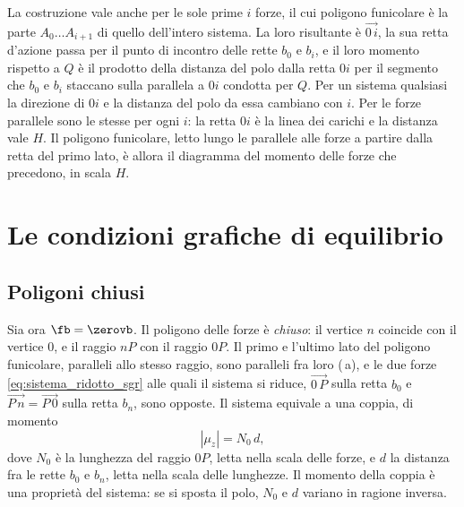 \begin{oss}
	\label{oss:momento_parziale_sgr}
	La costruzione vale anche per le sole prime $i$ forze, il cui poligono funicolare è la parte
	$A_0 \dots A_{i+1}$ di quello dell'intero sistema. La loro risultante è $\overrightarrow{0\,i}$,
	la sua retta d'azione passa per il punto di incontro delle rette $b_0$ e $b_i$, e il loro
	momento rispetto a $Q$ è il prodotto della distanza del polo dalla retta $0i$ per il segmento
	che $b_0$ e $b_i$ staccano sulla parallela a $0i$ condotta per $Q$. Per un sistema qualsiasi la
	direzione di $0i$ e la distanza del polo da essa cambiano con $i$. Per le forze parallele sono
	le stesse per ogni $i$: la retta $0i$ è la linea dei carichi e la distanza vale $H$. Il
	poligono funicolare, letto lungo le parallele alle forze a partire dalla retta del primo lato, è
	allora il diagramma del momento delle forze che precedono, in scala $H$.
\end{oss}

\section{Le condizioni grafiche di equilibrio}
\label{sec:equilibrio_sgr}

\subsection{Poligoni chiusi}
\label{sec:poligoni_chiusi_sgr}

Sia ora $\fb = \zerovb$. Il poligono delle forze è \emph{chiuso}: il vertice $n$ coincide con il
vertice $0$, e il raggio $nP$ con il raggio $0P$. Il primo e l'ultimo lato del poligono
funicolare, paralleli allo stesso raggio, sono paralleli fra loro
(\,a), e le due forze \eqref{eq:sistema_ridotto_sgr} alle quali il
sistema si riduce, $\overrightarrow{0\,P}$ sulla retta $b_0$ e
$\overrightarrow{P\,n} = \overrightarrow{P\,0}$ sulla retta $b_n$, sono opposte. Il sistema
equivale a una coppia, di momento
\begin{equation}
	|\mu_z| = N_0\,d ,
	\label{eq:coppia_sgr}
\end{equation}
dove $N_0$ è la lunghezza del raggio $0P$, letta nella scala delle forze, e $d$ la distanza fra le
rette $b_0$ e $b_n$, letta nella scala delle lunghezze. Il momento della coppia è una proprietà
del sistema: se si sposta il polo, $N_0$ e $d$ variano in ragione inversa.

